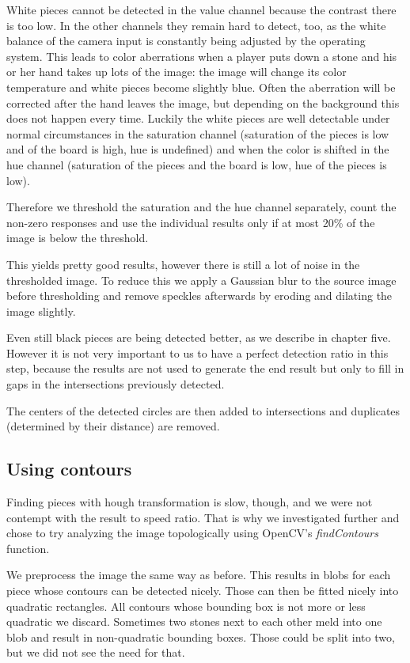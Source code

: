 	White pieces cannot be detected in the value channel because the contrast there is too low. In the other channels they remain hard to detect, too, as the white balance of the camera input is constantly being adjusted by the operating system. This leads to color aberrations when a player puts down a stone and his or her hand takes up lots of the image: the image will change its color temperature and white pieces become slightly blue. Often the aberration will be corrected after the hand leaves the image, but depending on the background this does not happen every time. Luckily the white pieces are well detectable under normal circumstances in the saturation channel (saturation of the pieces is low and of the board is high, hue is undefined) and when the color is shifted in the hue channel (saturation of the pieces and the board is low, hue of the pieces is low).

	Therefore we threshold the saturation and the hue channel separately, count the non-zero responses and use the individual results only if at most 20\% of the image is below the threshold.

	This yields pretty good results, however there is still a lot of noise in the thresholded image. To reduce this we apply a Gaussian blur to the source image before thresholding and remove speckles afterwards by eroding and dilating the image slightly.

	Even still black pieces are being detected better, as we describe in chapter five. However it is not very important to us to have a perfect detection ratio in this step, because the results are not used to generate the end result but only to fill in gaps in the intersections previously detected.

	The centers of the detected circles are then added to intersections and duplicates (determined by their distance) are removed.

	\subsection{Using contours}
	\label{detector-occluded-contours}
	Finding pieces with hough transformation is slow, though, and we were not contempt with the result to speed ratio. That is why we investigated further and chose to try analyzing the image topologically using OpenCV's \emph{findContours} function.

	We preprocess the image the same way as before. This results in blobs for each piece whose contours can be detected nicely. Those can then be fitted nicely into quadratic rectangles. All contours whose bounding box is not more or less quadratic we discard. Sometimes two stones next to each other meld into one blob and result in non-quadratic bounding boxes. Those could be split into two, but we did not see the need for that.

